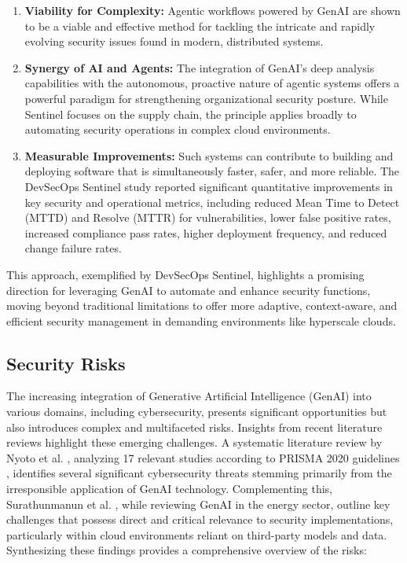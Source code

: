 \begin{enumerate}
    \item \textbf{Viability for Complexity:} Agentic workflows powered by GenAI are shown to be a viable and effective method for tackling the intricate and rapidly evolving security issues found in modern, distributed systems\cite{noauthor_devsecops_nodate}.
    \item \textbf{Synergy of AI and Agents:} The integration of GenAI's deep analysis capabilities with the autonomous, proactive nature of agentic systems offers a powerful paradigm for strengthening organizational security posture\cite{noauthor_devsecops_nodate}. While Sentinel focuses on the supply chain, the principle applies broadly to automating security operations in complex cloud environments.
    \item \textbf{Measurable Improvements:} Such systems can contribute to building and deploying software that is simultaneously faster, safer, and more reliable. The DevSecOps Sentinel study reported significant quantitative improvements in key security and operational metrics, including reduced Mean Time to Detect (MTTD) and Resolve (MTTR) for vulnerabilities, lower false positive rates, increased compliance pass rates, higher deployment frequency, and reduced change failure rates\cite{noauthor_devsecops_nodate}.
\end{enumerate}

This approach, exemplified by DevSecOps Sentinel, highlights a promising direction for leveraging GenAI to automate and enhance security functions, moving beyond traditional limitations to offer more adaptive, context-aware, and efficient security management in demanding environments like hyperscale clouds.


\subsection{Security Risks} %
\label{sec:Security Risks}

The increasing integration of Generative Artificial Intelligence (GenAI) into various domains, including cybersecurity, presents significant opportunities but also introduces complex and multifaceted risks. Insights from recent literature reviews highlight these emerging challenges. A systematic literature review by Nyoto et al. \cite{nyoto_cyber_2024}, analyzing 17 relevant studies according to PRISMA 2020 guidelines \cite{page_prisma_2021}, identifies several significant cybersecurity threats stemming primarily from the irresponsible application of GenAI technology. Complementing this, Surathunmanun et al. \cite{surathunmanun_exploring_2024}, while reviewing GenAI in the energy sector, outline key challenges that possess direct and critical relevance to security implementations, particularly within cloud environments reliant on third-party models and data. Synthesizing these findings provides a comprehensive overview of the risks:


